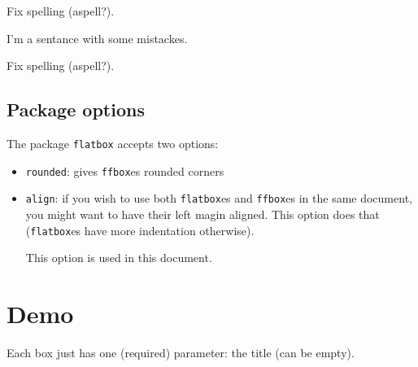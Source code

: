 \documentclass[a4paper]{article}
\begin{document}
\begin{errorbox}
  Fix spelling (aspell?).
\end{errorbox}

\begin{latexcode}
I'm a sentance with some mistackes.

\begin{errorbox}
  Fix spelling (aspell?).
\end{errorbox}
\end{latexcode}

\subsection{Package options}
The package \texttt{flatbox} accepts two options:
\begin{itemize}
\item \texttt{rounded}: gives \texttt{ffbox}es rounded corners
\item \texttt{align}: if you wish to use both \texttt{flatbox}es and
  \texttt{ffbox}es in the same document, you might want to have their left magin
  aligned. This option does that (\texttt{flatbox}es have more indentation otherwise).

  This option is used in this document.
\end{itemize}

\newpage
\section{Demo}
\label{sec:show}
Each box just has one (required) parameter: the title (can be empty).

\end{document}
